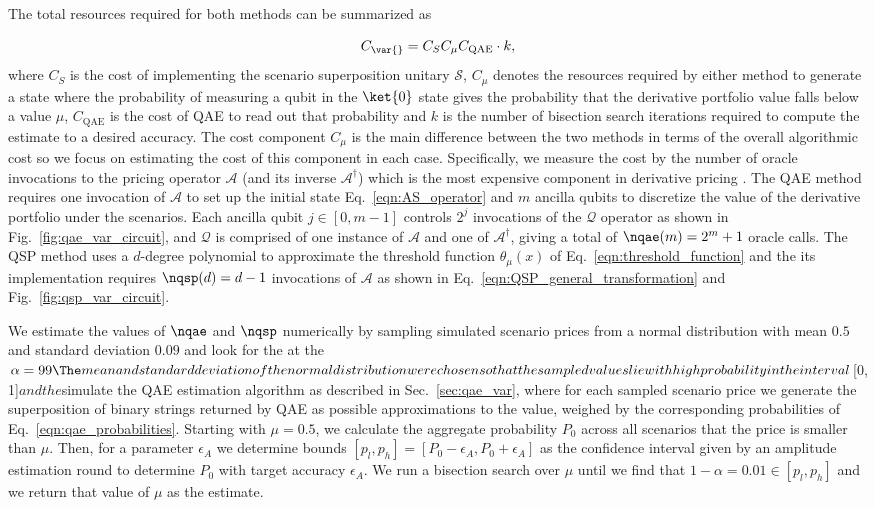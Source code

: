 \begin{enumerate}
The total resources required for both methods can be summarized as

\begin{equation}
	\label{eqn:total_cost}
	C_{\textrm{\var{}}} = C_{S}C_{\mu}C_{\textrm{QAE}}\cdot k,
\end{equation}
where $C_{S}$ is the cost of implementing the scenario superposition unitary $\mathcal{S}$, $C_{\mu}$ denotes the resources required by either method to generate a state where the probability of measuring a qubit in the $\ket{0}$ state gives the probability that the derivative portfolio value falls below a value $\mu$, $C_{\textrm{QAE}}$ is the cost of QAE to read out that probability and $k$ is the number of bisection search iterations required to compute the \var{} estimate to a desired accuracy.
The cost component $C_{\mu}$ is the main difference between the two methods in terms of the overall algorithmic cost so we focus on estimating the cost of this component in each case.
Specifically, we measure the cost by the number of oracle invocations to the pricing operator $\mathcal{A}$ (and its inverse $\mathcal{A}^{\dagger}$) which is the most expensive component in derivative pricing \cite{chakrabarti2021threshold}.
The QAE method requires one invocation of $\mathcal{A}$ to set up the initial state Eq.~\eqref{eqn:AS_operator} and $m$ ancilla qubits to discretize the value of the derivative portfolio under the scenarios.
Each ancilla qubit $j \in [0, m-1]$ controls $2^j$ invocations of the $\mathcal{Q}$ operator as shown in Fig.~\ref{fig:qae_var_circuit}, and $\mathcal{Q}$ is comprised of one instance of $\mathcal{A}$ and one of $\mathcal{A}^{\dagger}$, giving a total of $\nqae(m) = 2^m+1$ oracle calls.
The QSP method uses a $d$-degree polynomial to approximate the threshold function $\theta_{\mu}(x)$ of Eq.~\eqref{eqn:threshold_function} and the its implementation requires $\nqsp(d) = d-1$ invocations of $\mathcal{A}$ as shown in Eq.~\eqref{eqn:QSP_general_transformation} and Fig.~\ref{fig:qsp_var_circuit}.

We estimate the values of $\nqae$ and $\nqsp$ numerically by sampling simulated scenario prices from a normal distribution with mean $0.5$ and standard deviation $0.09$ and look for the \var{} at the $\alpha=99\The mean and standard deviation of the normal distribution were chosen so that the sampled values lie with high probability in the interval $[0, 1]$ and the $\We simulate the QAE \var{} estimation algorithm as described in Sec.~\ref{sec:qae_var}, where for each sampled scenario price we generate the superposition of binary strings returned by QAE as possible approximations to the value, weighed by the corresponding probabilities of Eq.~\eqref{eqn:qae_probabilities}.
Starting with $\mu=0.5$, we calculate the aggregate probability $P_0$ across all scenarios that the price is smaller than $\mu$.
Then, for a parameter $\epsilon_A$ we determine bounds $[p_l, p_h] = [P_0-\epsilon_A, P_0+\epsilon_A]$ as the confidence interval given by an amplitude estimation round to determine $P_0$ with target accuracy $\epsilon_A$.
We run a bisection search over $\mu$ until we find that $1-\alpha=0.01 \in [p_l, p_h]$ and we return that value of $\mu$ as the \var{} estimate.


\end{enumerate}
